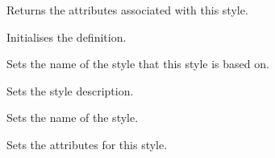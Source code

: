 Returns the attributes associated with this style.

\label{wxrichtextstyledefinitioninit}


Initialises the definition.

\label{wxrichtextstyledefinitionsetbasestyle}


Sets the name of the style that this style is based on.

\label{wxrichtextstyledefinitionsetdescription}


Sets the style description.

\label{wxrichtextstyledefinitionsetname}


Sets the name of the style.

\label{wxrichtextstyledefinitionsetstyle}


Sets the attributes for this style.

